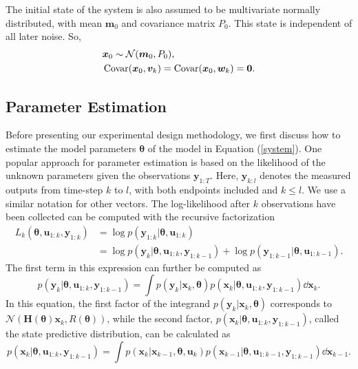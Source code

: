 \\
\\
The initial state of the system is also assumed to be multivariate normally distributed, with mean $\bm m_0$ and covariance matrix $P_0$. This state is independent of all later noise. So,
\begin{equation}
\begin{aligned}
& \bm x_0 \sim \mathcal{N}(\bm m_0,P_0),\\
&\operatorname{\mathrm{Covar}}(\bm x_0,\bm v_k) = \operatorname{\mathrm{Covar}}(\bm x_0,\bm w_k) = \bm 0.
\label{initial state}
\end{aligned}
\end{equation}
\subsection{Parameter Estimation}
Before presenting our experimental design methodology, we first discuss how to estimate the model parameters $\bm \theta$ of the model in Equation  (\ref{system}). One popular approach for parameter estimation is based on the likelihood of the unknown parameters given the observations $\bm y_{1:T}$. Here, $\bm y_{k:l}$ denotes the measured outputs from time-step $k$ to $l$, with both endpoints included and $k \leq l$. We use a similar notation for other vectors.
The log-likelihood after $k$ observations have been collected can be computed with the recursive factorization
\begin{align}
L_k(\bm \theta, \bm u_{1:k}, \bm y_{1:k}) &= \log p(\bm y_{1:k}|\bm \theta, \bm u_{1:k})\\
&=  \log p(\bm y_k|\bm \theta, \bm u_{1:k},\bm y_{1:k-1}) 
+ \log p(\bm y_{1:k-1}|\bm \theta, \bm u_{1:k-1}).
\label{factorization}
\end{align}
The first term in this expression can further be computed as
\begin{equation}
p(\bm y_k|\bm \theta, \bm u_{1:k},\bm y_{1:k-1})
= \int p(\bm y_k|\bm x_k, \bm \theta)p(\bm x_k|\bm \theta, \bm u_{1:k},\bm y_{1:k-1})\dd \bm x_k.
\label{likelihood factor}
\end{equation}
In this equation, the first factor of the integrand $p(\bm y_k|\bm x_k, \bm \theta)$ corresponds to $\mathcal{N}(\bm H(\bm \theta)\bm x_k,R(\bm \theta))$, while the second factor, $p(\bm x_k|\bm \theta, \bm u_{1:k},\bm y_{1:k-1})$, called the state predictive distribution, can be calculated as
\begin{equation}
p(\bm x_k|\bm \theta, \bm u_{1:k},\bm y_{1:k-1}) = \int p(\bm x_k|\bm x_{k-1}, \bm \theta, \bm u_k)
p(\bm x_{k-1}|\bm \theta, \bm u_{1:k-1},\bm y_{1:k-1})\dd \bm x_{k-1}.
\end{equation}
